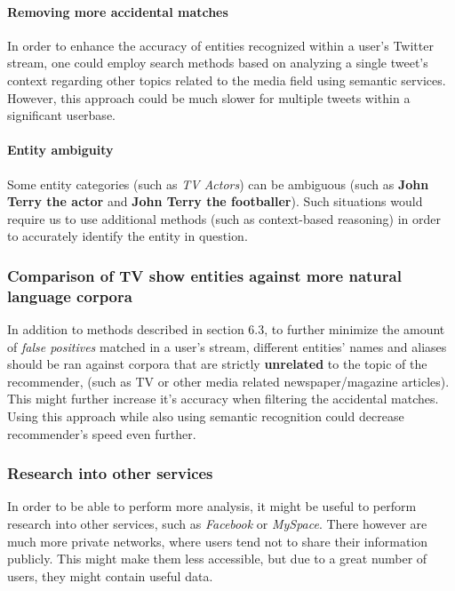 \paragraph{Removing more accidental matches}

In order to enhance the accuracy of entities recognized within a user's Twitter
stream, one could employ search methods based on analyzing a single tweet's
context regarding other topics related to the media field using semantic
services.  However, this approach could be much slower for multiple tweets
within a significant userbase.

\paragraph{Entity ambiguity}

Some entity categories (such as \textit{TV Actors}) can be ambiguous (such as \textbf{John Terry the actor} and \textbf{John Terry the footballer}). Such situations
would require us to use additional methods (such as context-based reasoning) in order to accurately identify the entity in question.

\subsubsection{Comparison of TV show entities against more natural language corpora}

In addition to methods described in section 6.3, to further minimize the amount of \textit{false positives}
matched in a user's stream, different entities' names and aliases should be ran against corpora
that are strictly \textbf{unrelated} to the topic of the recommender, (such as TV or other media related
newspaper/magazine articles). This might further increase it's accuracy when filtering the accidental
matches. Using this approach while also using semantic recognition could decrease recommender's
speed even further.

\subsubsection{Research into other services}

In order to be able to perform more analysis, it might be useful to perform
research into other services, such as \textit{Facebook} or \textit{MySpace}.
There however are much more private networks, where users tend not to share
their information publicly. This might make them less accessible, but due to a
great number of users, they might contain useful data.

